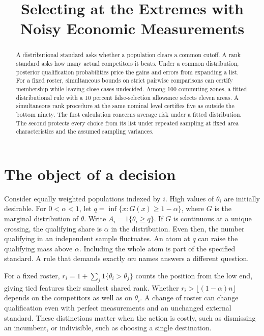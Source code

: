 \documentclass[11pt]{article}
\title{Selecting at the Extremes with Noisy Economic Measurements}
\author{}
\date{}
\begin{document}
\maketitle
\begin{abstract}
A distributional standard asks whether a population clears a common cutoff. A rank standard asks how many actual competitors it beats. Under a common distribution, posterior qualification probabilities price the gains and errors from expanding a list. For a fixed roster, simultaneous bounds on strict pairwise comparisons can certify membership while leaving close cases undecided. Among 100 commuting zones, a fitted distributional rule with a 10 percent false-selection allowance selects eleven areas. A simultaneous rank procedure at the same nominal level certifies five as outside the bottom ninety. The first calculation concerns average risk under a fitted distribution. The second protects every choice from its list under repeated sampling at fixed area characteristics and the assumed sampling variances.
\end{abstract}

\section{The object of a decision}
Consider equally weighted populations indexed by $i$. High values of $\theta_i$ are initially desirable. For $0<\alpha<1$, let $q=\inf\{x:G(x)\ge 1-\alpha\}$, where $G$ is the marginal distribution of $\theta$. Write $A_i=1\{\theta_i\ge q\}$. If $G$ is continuous at a unique crossing, the qualifying share is $\alpha$ in the distribution. Even then, the number qualifying in an independent sample fluctuates. An atom at $q$ can raise the qualifying mass above $\alpha$. Including the whole atom is part of the specified standard. A rule that demands exactly $\alpha n$ names answers a different question.

For a fixed roster, $r_i=1+\sum_j1\{\theta_i>\theta_j\}$ counts the position from the low end, giving tied features their smallest shared rank. Whether $r_i>\lfloor(1-\alpha)n\rfloor$ depends on the competitors as well as on $\theta_i$. A change of roster can change qualification even with perfect measurements and an unchanged external standard. These distinctions matter when the action is costly, such as dismissing an incumbent, or indivisible, such as choosing a single destination.
\end{document}
